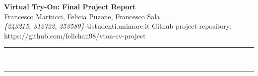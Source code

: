 \documentclass[a4paper,12pt]{article}
\renewenvironment{abstract}
 {\par\noindent\textbf{\abstractname}\ \ignorespaces \\}
 {\par\noindent\medskip}
\begin{document}
\pagestyle{fancy}
\thispagestyle{empty}
\fancyhead[L]{}

\renewcommand*{\thefootnote}{\fnsymbol{footnote}}

\begin{center}
\Large{\textbf{Virtual Try-On: Final Project Report}} 
\vspace{0.4cm}
\normalsize
\\ Francesco Martucci, Felicia Puzone, Francesco Sala \\
\vspace{0.1cm}
\textit{\{243215, 312722, 253589\}}
\small{@studenti.unimore.it}
Github project repository: https://github.com/felichan98/vton-cv-project\\
\medskip
\normalsize
\end{center}

{\color{gray}\hrule}
\vspace{0.4cm}
\begin{abstract}

\end{abstract}

\setlength{\textwidth}{200pt}

{\color{gray}\hrule}
\medskip






\end{document}
